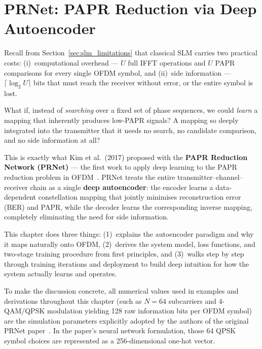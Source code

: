 \chapter{PRNet: PAPR Reduction via Deep Autoencoder}
\label{ch:prnet}

\begin{motivation}
    Recall from Section~\ref{sec:slm_limitations} that classical SLM carries
    two practical costs: (i)~computational overhead --- $U$ full IFFT operations
    and $U$ PAPR comparisons for every single OFDM symbol, and (ii)~side
    information --- $\lceil\log_2 U\rceil$ bits that must reach the receiver
    without error, or the entire symbol is lost.

    What if, instead of \emph{searching} over a fixed set of phase sequences,
    we could \emph{learn} a mapping that inherently produces low-PAPR signals?
    A mapping so deeply integrated into the transmitter that it needs no search,
    no candidate comparison, and no side information at all?

    This is exactly what Kim et al.\ (2017) proposed with the
    \textbf{PAPR Reduction Network (PRNet)} --- the first work to apply
    deep learning to the PAPR reduction problem in
    OFDM~\cite{kim2017novel}.  PRNet treats the entire
    transmitter--channel--receiver chain as a single \textbf{deep autoencoder}:
    the encoder learns a data-dependent constellation mapping that jointly
    minimises reconstruction error (BER) and PAPR, while the decoder learns
    the corresponding inverse mapping, completely eliminating the need for
    side information.

    This chapter does three things: (1)~explains the autoencoder paradigm and
    why it maps naturally onto OFDM, (2)~derives the system model, loss
    functions, and two-stage training procedure from first principles, and
    (3)~walks step by step through training iterations and deployment to build
    deep intuition for how the system actually learns and operates.
\end{motivation}

\begin{keyinsight}
    To make the discussion concrete, all numerical values used in examples
    and derivations throughout this chapter (such as $N = 64$ subcarriers
    and 4-QAM/QPSK modulation yielding 128 raw information bits per OFDM
    symbol) are the simulation parameters explicitly adopted by the authors
    of the original PRNet paper~\cite{kim2017novel}.  In the paper's neural
    network formulation, those 64 QPSK symbol choices are represented as a
    256-dimensional one-hot vector.
\end{keyinsight}


